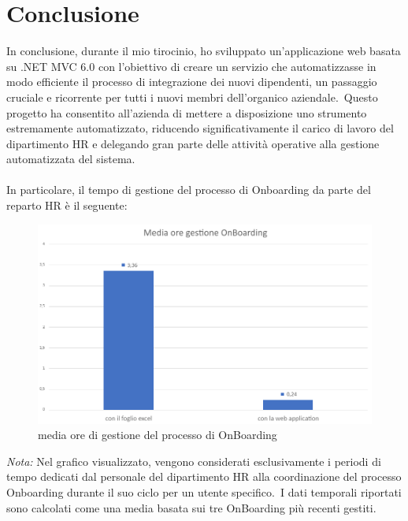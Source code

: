 \chapter*{Conclusione} %
%
In conclusione, durante il mio tirocinio, ho sviluppato un'applicazione web basata su .NET MVC 6.0 con 
l'obiettivo di creare un servizio che automatizzasse in modo efficiente il 
processo di integrazione dei nuovi dipendenti, un passaggio cruciale e ricorrente per 
tutti i nuovi membri dell'organico aziendale.\ Questo progetto ha consentito 
all'azienda di mettere a disposizione uno strumento estremamente automatizzato, riducendo 
significativamente il carico di lavoro del dipartimento HR e delegando gran parte delle 
attività operative alla gestione automatizzata del sistema.
\\ \\ 
In particolare, il tempo di gestione del processo di Onboarding da parte del reparto HR  è il seguente:
%
\begin{figure}[ht]
	\centering
	\includegraphics[width=\textwidth]{img/conclusione1.png}
	\caption{media ore di gestione del processo di OnBoarding}
	\label{fig:conclusione1}
\end{figure} 
\textit{Nota:} Nel grafico visualizzato, vengono considerati esclusivamente i periodi di tempo dedicati dal personale 
del dipartimento HR alla coordinazione del processo Onboarding durante il suo ciclo per un utente specifico.\ I dati 
temporali riportati sono calcolati come una media basata sui tre OnBoarding più recenti gestiti.\
